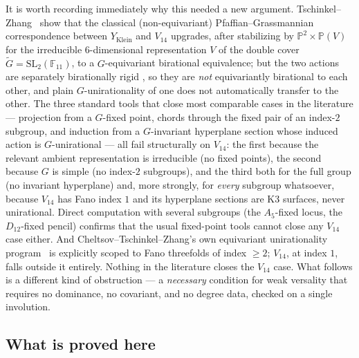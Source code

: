 \documentclass[11pt]{article}
\theoremstyle{plain}
\theoremstyle{definition}
\theoremstyle{remark}
\newcommand{\SLg}{\mathrm{SL}_2(\mathbb{F}_{11})}
\newcommand{\PP}{\mathbb P}
\begin{document}
It is worth recording immediately why this needed a new argument.
Tschinkel--Zhang~\cite{TZ} show that the classical (non-equivariant)
Pfaffian--Grassmannian correspondence between $Y_{\mathrm{Klein}}$ and
$V_{14}$ upgrades, after stabilizing by $\PP^2\times\PP(V)$ for the
irreducible $6$-dimensional representation $V$ of the double cover
$\widetilde G=\SLg$, to a $G$-equivariant birational equivalence; but
the two actions are separately birationally rigid \cite[Thm.\
4.3]{BCDP}, so they are \emph{not} equivariantly birational to each
other, and plain $G$-unirationality of one does not automatically
transfer to the other. The three standard tools that close most
comparable cases in the literature --- projection from a $G$-fixed
point, chords through the fixed pair of an index-$2$ subgroup, and
induction from a $G$-invariant hyperplane section whose induced action
is $G$-unirational \cite[Prop.\ 3.5]{CTZ} --- all fail structurally on
$V_{14}$: the first because the relevant ambient representation is
irreducible (no fixed points), the second because $G$ is simple (no
index-$2$ subgroups), and the third both for the full group (no
invariant hyperplane) and, more strongly, for \emph{every} subgroup
whatsoever, because $V_{14}$ has Fano index $1$ and its hyperplane
sections are K3 surfaces, never unirational. Direct computation with
several subgroups (the $A_5$-fixed locus, the $D_{12}$-fixed pencil)
confirms that the usual fixed-point tools cannot close any $V_{14}$
case either. And Cheltsov--Tschinkel--Zhang's own equivariant
unirationality program~\cite{CTZ} is explicitly scoped to Fano threefolds
of index $\ge 2$; $V_{14}$, at index $1$, falls outside it entirely.
Nothing in the literature closes the $V_{14}$ case. What follows is a
different kind of obstruction --- a \emph{necessary} condition for weak
versality that requires no dominance, no covariant, and no degree data,
checked on a single involution.

\subsection{What is proved here}
\end{document}
